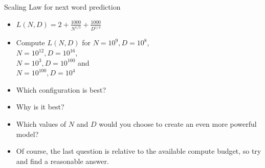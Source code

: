 \documentclass[11pt,compress,t,notes=noshow, xcolor=table]{beamer}
\begin{document}
\begin{vbframe}{Scaling Law for next word prediction}

\vfill

\begin{itemize}
    \item $L(N,D) = 2 + \frac{1000}{N^{1/3}} + \frac{1000}{D^{1/4}}$
    \item \ques Compute $L(N,D)$ for
    $N=10^9,D=10^8$,\\
    $N=10^{12},D=10^{16}$,\\
    $N=10^3,D=10^{100}$ and\\
    $N=10^{100},D=10^4$
    \item \ques Which configuration is best?

    \item \ques Why is it best?

      \item 
 \ques Which values of $N$ and $D$ would you choose
    to create an even more powerful model?

\item Of course, the last question is relative to 
the  available compute budget, so try and find a reasonable answer.


\end{itemize}

\vfill

\end{vbframe}

\end{document}
